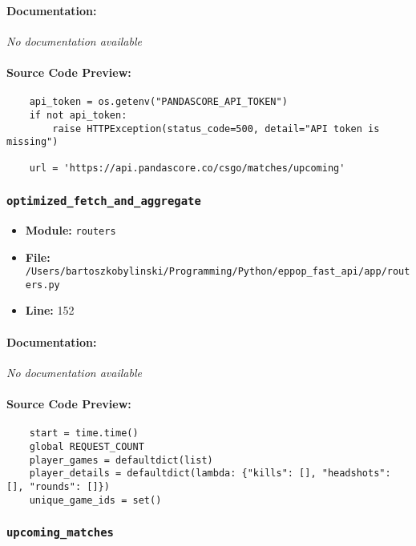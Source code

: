 \documentclass[11pt,a4paper]{article}
\begin{document}
\paragraph{Documentation:} \textit{No documentation available}

\paragraph{Source Code Preview:}
\begin{verbatim}
    api_token = os.getenv("PANDASCORE_API_TOKEN")
    if not api_token:
        raise HTTPException(status_code=500, detail="API token is missing")

    url = 'https://api.pandascore.co/csgo/matches/upcoming'
\end{verbatim}

\vspace{1em}
\subsubsection{\texttt{optimized\_fetch\_and\_aggregate}}

\begin{itemize}
    \item \textbf{Module:} \texttt{routers}
    \item \textbf{File:} \texttt{/Users/bartoszkobylinski/Programming/Python/eppop\_fast\_api/app/routers.py}
    \item \textbf{Line:} 152
\end{itemize}

\paragraph{Documentation:} \textit{No documentation available}

\paragraph{Source Code Preview:}
\begin{verbatim}
    start = time.time()
    global REQUEST_COUNT
    player_games = defaultdict(list)
    player_details = defaultdict(lambda: {"kills": [], "headshots": [], "rounds": []})
    unique_game_ids = set()
\end{verbatim}

\vspace{1em}
\subsubsection{\texttt{upcoming\_matches}}
\end{document}
